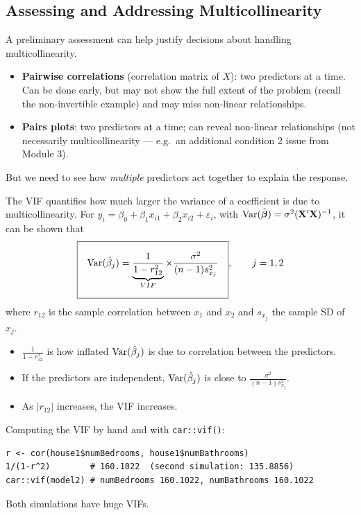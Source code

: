 \subsection{Assessing and Addressing Multicollinearity}

\begin{remark}
    A preliminary assessment can help justify decisions about handling multicollinearity.
    \begin{itemize}
        \item \textbf{Pairwise correlations} (correlation matrix of $X$): two predictors at a time.
        Can be done early, but may not show the full extent of the problem (recall the
        non-invertible example) and may miss non-linear relationships.
        \item \textbf{Pairs plots}: two predictors at a time; can reveal non-linear relationships
        (not necessarily multicollinearity --- e.g.\ an additional condition 2 issue from Module 3).
    \end{itemize}
    But we need to see how \emph{multiple} predictors act together to explain the response.
\end{remark}

\begin{definition}
    The VIF quantifies how much larger the variance of a coefficient is due to
    multicollinearity. For $y_i=\beta_0+\beta_1x_{i1}+\beta_2x_{i2}+\varepsilon_i$, with
    $\operatorname{Var}(\hat{\boldsymbol\beta})=\sigma^2(\mathbf{X}'\mathbf{X})^{-1}$, it can be shown that
    \[\boxed{\Var(\hat\beta_j)=\underbrace{\frac{1}{1-r_{12}^2}}_{VIF}\times\frac{\sigma^2}{(n-1)s_{x_j}^2}},\qquad j=1,2\]
    where $r_{12}$ is the sample correlation between $x_1$ and $x_2$ and $s_{x_j}$ the sample SD of $x_j$.
    \begin{itemize}
        \item $\frac{1}{1-r_{12}^2}$ is how inflated $\operatorname{Var}(\hat\beta_j)$ is due to correlation
        between the predictors.
        \item If the predictors are independent, $\operatorname{Var}(\hat\beta_j)$ is close to $\frac{\sigma^2}{(n-1)s_{x_j}^2}$.
        \item As $|r_{12}|$ increases, the VIF increases.
    \end{itemize}
\end{definition}

\begin{example}
    Computing the VIF by hand and with \texttt{car::vif()}:
\begin{verbatim}
r <- cor(house1$numBedrooms, house1$numBathrooms)
1/(1-r^2)        # 160.1022  (second simulation: 135.8856)
car::vif(model2) # numBedrooms 160.1022, numBathrooms 160.1022
\end{verbatim}
    Both simulations have huge VIFs. 
\end{example}

